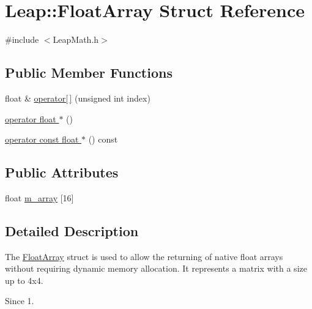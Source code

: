 \hypertarget{struct_leap_1_1_float_array}{\section{Leap\+:\+:Float\+Array Struct Reference}
\label{struct_leap_1_1_float_array}
}


{\ttfamily \#include $<$Leap\+Math.\+h$>$}

\subsection*{Public Member Functions}
\begin{DoxyCompactItemize}
\item 
float \& \hyperlink{struct_leap_1_1_float_array_a9c4977609b3c6026fa9fd9091de35c1d}{operator\mbox{[}$\,$\mbox{]}} (unsigned int index)
\item 
\hyperlink{struct_leap_1_1_float_array_ad2e74b6ec198761806cc2d3c8bd28c74}{operator float $\ast$} ()
\item 
\hyperlink{struct_leap_1_1_float_array_ad71bfc9b61769596df36d38b5db365e6}{operator const float $\ast$} () const 
\end{DoxyCompactItemize}
\subsection*{Public Attributes}
\begin{DoxyCompactItemize}
\item 
float \hyperlink{struct_leap_1_1_float_array_a6f3a08d99f887c2f7afeb90955565a90}{m\+\_\+array} \mbox{[}16\mbox{]}
\end{DoxyCompactItemize}


\subsection{Detailed Description}
The \hyperlink{struct_leap_1_1_float_array}{Float\+Array} struct is used to allow the returning of native float arrays without requiring dynamic memory allocation. It represents a matrix with a size up to 4x4. \begin{DoxySince}{Since}
1. 
\end{DoxySince}


